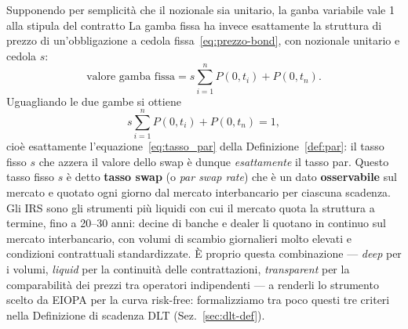 \documentclass[11pt,a4paper]{article}
\theoremstyle{plain}
\theoremstyle{definition}
\theoremstyle{remark}
\begin{document}
Supponendo per semplicità che il nozionale sia unitario, la ganba variabile vale 1 alla stipula del contratto  
La gamba fissa ha invece esattamente la
struttura di prezzo di un'obbligazione a cedola fissa~\eqref{eq:prezzo-bond}, con nozionale
unitario e cedola $s$:
\[
  \text{valore gamba fissa} = s\sum_{i=1}^n P(0,t_i) + P(0,t_n).
\]
Uguagliando le due gambe si ottiene
\[
  s\sum_{i=1}^n P(0,t_i) + P(0,t_n) = 1,
\]
cio\`e esattamente l'equazione~\eqref{eq:tasso_par} della Definizione~\ref{def:par}: il tasso
fisso $s$ che azzera il valore dello swap \`e dunque \emph{esattamente} il tasso par.
Questo tasso fisso $s$ \`e detto \textbf{tasso swap} (o
\emph{par swap rate}) che è un dato
\textbf{osservabile} sul mercato e quotato ogni giorno dal mercato interbancario per ciascuna scadenza. Gli IRS sono gli strumenti pi\`u liquidi con cui il mercato quota la struttura a
termine, fino a 20--30 anni: decine di banche e dealer li quotano in continuo sul mercato
interbancario, con volumi di scambio giornalieri molto elevati e condizioni contrattuali
standardizzate. \`E proprio questa combinazione --- \emph{deep} per i volumi, \emph{liquid}
per la continuit\`a delle contrattazioni, \emph{transparent} per la comparabilit\`a dei
prezzi tra operatori indipendenti --- a renderli lo strumento scelto da EIOPA per la curva
risk-free: formalizziamo tra poco questi tre criteri nella Definizione di scadenza DLT
(Sez.~\ref{sec:dlt-def}).
\end{document}
